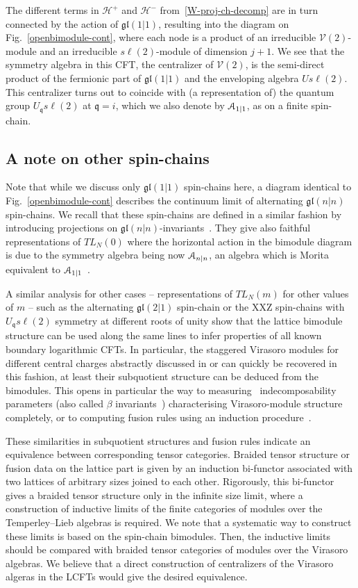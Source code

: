 \documentclass[11pt]{article}
\newcommand{\q}{\mathfrak{q}}
\newcommand{\TL}[1]{TL_{#1}}
\newcommand{\LQG}{U_{\q} s\ell(2)}
\newcommand{\Vir}{\mathcal{V}}
\newcommand{\SU}{s\ell}
\newcommand{\gl}{\mathfrak{gl}}
\newcommand{\WP}{\mathcal{H}}
\theoremstyle{definition}
\begin{document}
The different terms in $\WP^+$ and $\WP^-$ from~\eqref{W-proj-ch-decomp} are in turn connected by
the action of $\gl(1|1)$, resulting into the diagram on
Fig.~\ref{openbimodule-cont}, where each
node is a product of an irreducible $\Vir(2)$-module and an irreducible $\SU(2)$-module  of dimension $j+1$. We
see that the symmetry algebra in this CFT, the centralizer of $\Vir(2)$,
is the semi-direct product of the fermionic part of $\gl(1|1)$ and
 the enveloping algebra $U s\ell(2)$. This centralizer turns out to
 coincide with (a representation of) the quantum group
 $\LQG$ at $\q=i$, which we also denote by ${\cal
 A}_{1|1}$, as on a finite spin-chain.


\subsection{A note on other spin-chains}\label{categorical}
 Note that while we discuss only $\gl(1|1)$ spin-chains here, a diagram identical
 to Fig.~\ref{openbimodule-cont}
 describes the continuum limit of alternating  $\gl(n|n)$ spin-chains.
 We recall that these spin-chains  are
 defined in a similar fashion by introducing projections on
 $\gl(n|n)$-invariants~\cite{ReadSaleur01}. They give also  faithful
 representations of $\TL{N}(0)$ where the
 horizontal action in the bimodule diagram is  due to the symmetry algebra being now
 ${\cal A}_{n|n}$, an algebra which is Morita equivalent to ${\cal
 A}_{1|1}$~\cite{ReadSaleur07-1}.


 A similar analysis for other cases -- representations of $\TL{N}(m)$
 for other values of $m$ -- such as the alternating $\gl(2|1)$ spin-chain
 or the XXZ spin-chains with $\LQG$ symmetry at different roots of unity show that the lattice
 bimodule structure can be used along the same lines to infer
 properties of all known boundary logarithmic CFTs. In particular, the
 staggered Virasoro modules for different central charges abstractly discussed in \cite{GK1} or \cite{MatRid}
 can quickly be recovered in this fashion, at least their subquotient
 structure can be deduced from the bimodules. This opens in particular
 the way to measuring~\cite{DubJacSal2,VasJacSal} indecomposability parameters (also called
 $\beta$ invariants~\cite{KitRid}) characterising Virasoro-module structure completely, or to computing fusion
 rules using an induction procedure~\cite{ReadSaleur07-1,ReadSaleur07-2, [GV]}.


These similarities in subquotient structures and fusion rules indicate
an equivalence between corresponding tensor categories.  Braided
tensor structure or fusion data on the lattice part is given by an
induction bi-functor associated with two lattices of arbitrary sizes
joined to each other. Rigorously, this bi-functor gives a braided tensor
structure only in the infinite size limit, where a construction
of inductive limits of the finite categories of modules over the
Temperley--Lieb algebras is required. We note that a  systematic way to construct
these limits is based on the spin-chain bimodules.  Then, the inductive
limits should be compared with braided tensor categories of modules over the
Virasoro algebras. We believe that a direct construction of
centralizers of the Virasoro algeras in the LCFTs would give
the desired equivalence.
\end{document}
